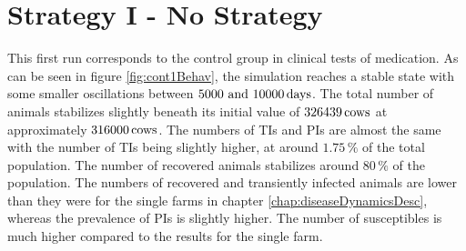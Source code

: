 \section{Strategy I - No Strategy}
This first run corresponds to the control group in clinical tests of medication. As can be seen in figure \ref{fig:cont1Behav}, the simulation reaches a stable state with some smaller oscillations between $5000\text{ and } 10000\,\text{days}$. The total number of animals stabilizes slightly beneath its initial value of $326439\,\text{cows}$ at approximately $316000\,\text{cows}$. The numbers of TIs and PIs are almost the same with the number of TIs being slightly higher, at around $1.75\,\%$ of the total population. The number of recovered animals stabilizes around $80\,\%$ of the population. The numbers of recovered and transiently infected animals are lower than they were for the single farms in chapter \ref{chap:diseaseDynamicsDesc}, whereas the prevalence of PIs is slightly higher. The number of susceptibles is much higher compared to the results for the single farm. 
